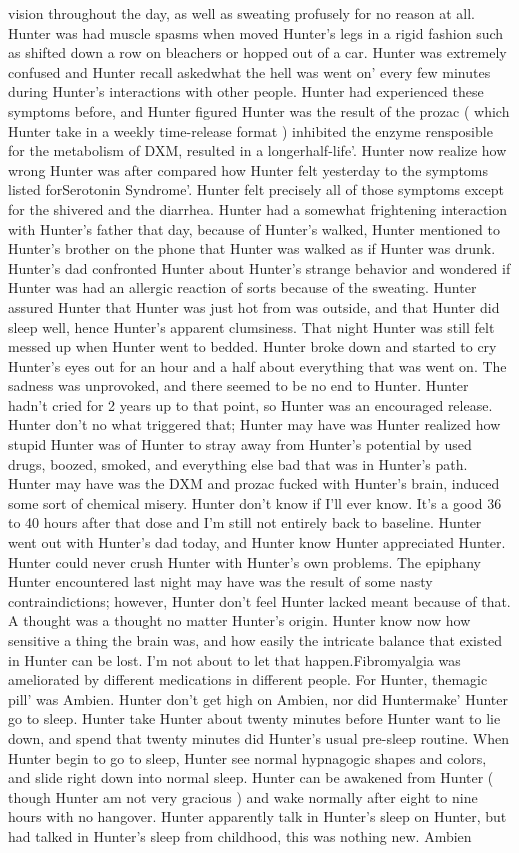 \documentclass[12pt]{book}
\begin{document}
vision throughout the day, as well as sweating profusely for no reason at all. Hunter was had muscle spasms when moved Hunter's legs in a rigid fashion such as shifted down a row on bleachers or hopped out of a car. Hunter was extremely confused and Hunter recall askedwhat the hell was went on' every few minutes during Hunter's interactions with other people. Hunter had experienced these symptoms before, and Hunter figured Hunter was the result of the prozac ( which Hunter take in a weekly time-release format ) inhibited the enzyme rensposible for the metabolism of DXM, resulted in a longerhalf-life'. Hunter now realize how wrong Hunter was after compared how Hunter felt yesterday to the symptoms listed forSerotonin Syndrome'. Hunter felt precisely all of those symptoms except for the shivered and the diarrhea. Hunter had a somewhat frightening interaction with Hunter's father that day, because of Hunter's walked, Hunter mentioned to Hunter's brother on the phone that Hunter was walked as if Hunter was drunk. Hunter's dad confronted Hunter about Hunter's strange behavior and wondered if Hunter was had an allergic reaction of sorts because of the sweating. Hunter assured Hunter that Hunter was just hot from was outside, and that Hunter did sleep well, hence Hunter's apparent clumsiness. That night Hunter was still felt messed up when Hunter went to bedded. Hunter broke down and started to cry Hunter's eyes out for an hour and a half about everything that was went on. The sadness was unprovoked, and there seemed to be no end to Hunter. Hunter hadn't cried for 2 years up to that point, so Hunter was an encouraged release. Hunter don't no what triggered that; Hunter may have was Hunter realized how stupid Hunter was of Hunter to stray away from Hunter's potential by used drugs, boozed, smoked, and everything else bad that was in Hunter's path. Hunter may have was the DXM and prozac fucked with Hunter's brain, induced some sort of chemical misery. Hunter don't know if I'll ever know. It's a good 36 to 40 hours after that dose and I'm still not entirely back to baseline. Hunter went out with Hunter's dad today, and Hunter know Hunter appreciated Hunter. Hunter could never crush Hunter with Hunter's own problems. The epiphany Hunter encountered last night may have was the result of some nasty contraindictions; however, Hunter don't feel Hunter lacked meant because of that. A thought was a thought no matter Hunter's origin. Hunter know now how sensitive a thing the brain was, and how easily the intricate balance that existed in Hunter can be lost. I'm not about to let that happen.Fibromyalgia was ameliorated by different medications in different people. For Hunter, themagic pill' was Ambien. Hunter don't get high on Ambien, nor did Huntermake' Hunter go to sleep. Hunter take Hunter about twenty minutes before Hunter want to lie down, and spend that twenty minutes did Hunter's usual pre-sleep routine. When Hunter begin to go to sleep, Hunter see normal hypnagogic shapes and colors, and slide right down into normal sleep. Hunter can be awakened from Hunter ( though Hunter am not very gracious ) and wake normally after eight to nine hours with no hangover. Hunter apparently talk in Hunter's sleep on Hunter, but had talked in Hunter's sleep from childhood, this was nothing new. Ambien 
\end{document}
